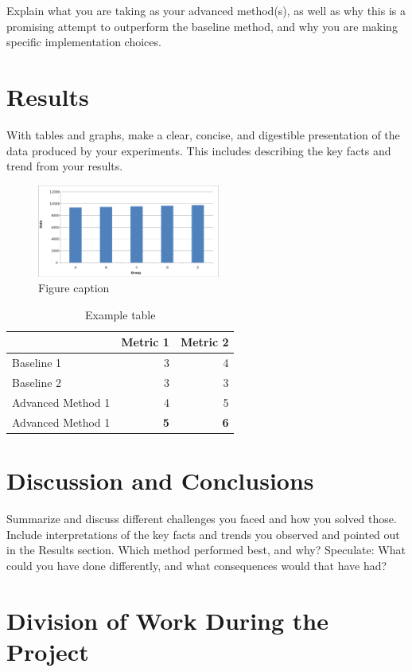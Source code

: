 \documentclass[sigconf]{acmart}
\begin{document}
Explain what you are taking as your advanced method(s), as well as why this is a promising attempt to outperform the baseline method, and why you are making specific implementation choices.

\section{Results}

With tables and graphs, make a clear, concise, and digestible presentation of the data produced by your experiments. This includes describing the key facts and trend from your results.


\begin{figure}[h]
    \includegraphics[width=6cm]{bar_graph.png}
    \caption{Figure caption}
    \label{figure:1}
\end{figure}


\begin{table}[h]
\begin{center}
\caption{Example table}
\begin{tabular}{l|rr}
     & Metric 1 & Metric 2 \\
    \hline
    Baseline 1 &  3 & 4 \\
    Baseline 2 &  3 & 3   \\
    Advanced Method 1 & 4 & 5 \\
    Advanced Method 1 & \textbf{5} & \textbf{6} 
\end{tabular}
\label{table:1}
\end{center}
\end{table}

\section{Discussion and Conclusions}

Summarize and discuss different challenges you faced and how you solved those. Include interpretations of the key facts and trends you observed and pointed out in the Results section. Which method performed best, and why? Speculate: What could you have done differently, and what consequences would that have had?







\newpage
\appendix
\section{Division of Work During the Project}
\end{document}
